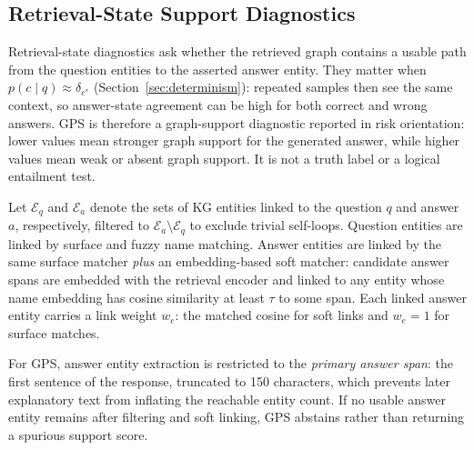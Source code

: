 \subsection{Retrieval-State Support Diagnostics}
\label{sec:struct_metrics}

Retrieval-state diagnostics ask whether the retrieved graph contains a usable
path from the question entities to the asserted answer entity.
They matter when $p(c \mid q) \approx \delta_{c^*}$
(Section~\ref{sec:determinism}): repeated samples then see the same context,
so answer-state agreement can be high for both correct and wrong answers.
GPS is therefore a graph-support diagnostic reported in risk orientation:
lower values mean stronger graph support for the generated answer, while
higher values mean weak or absent graph support. It is not a truth label or a
logical entailment test.

Let $\mathcal{E}_q$ and $\mathcal{E}_a$ denote the sets of KG entities linked
to the question $q$ and answer $a$, respectively, filtered to
$\mathcal{E}_a \setminus \mathcal{E}_q$ to exclude trivial self-loops.
Question entities are linked by surface and fuzzy name matching.
Answer entities are linked by the same surface matcher \emph{plus} an
embedding-based soft matcher: candidate answer spans are embedded with the
retrieval encoder and linked to any entity whose name embedding has cosine
similarity at least $\tau$ to some span.
Each linked answer entity carries a link weight $w_e$: the matched cosine for
soft links and $w_e = 1$ for surface matches.

For GPS, answer entity extraction is restricted to the \emph{primary answer span}:
the first sentence of the response, truncated to 150 characters, which
prevents later explanatory text from inflating the reachable entity count.
If no usable answer entity remains after filtering and soft linking, GPS
abstains rather than returning a spurious support score.


